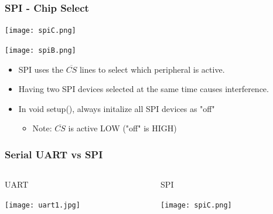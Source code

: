 \documentclass{beamer}
\begin{document}
\begin{frame}\frametitle{SPI - Chip Select}
\begin{center}
\texttt{[image: spiC.png]}

\texttt{[image: spiB.png]}

\vspace{.25cm}

\begin{itemize}
\item SPI uses the $\overline{CS}$ lines to select which peripheral is active.
\item Having two SPI devices selected at the same time causes interference. 
\item In void setup(), always initalize all SPI devices as "off"
	\begin{itemize}
	\item Note: $\overline{CS}$ is active LOW ("off" is HIGH)
	\end{itemize}
\end{itemize}
\end{center}
\end{frame}


\begin{frame}\frametitle{Serial UART vs SPI}
\begin{columns}
\begin{column}{5cm}
\begin{center}
UART

\vspace{.5cm}

\texttt{[image: uart1.jpg]}
\end{center}
\end{column}
\begin{column}{5cm}
\begin{center}
SPI

\vspace{.1cm}

\texttt{[image: spiC.png]}
\end{center}
\end{column}
\end{columns}
\end{frame}
\end{document}

